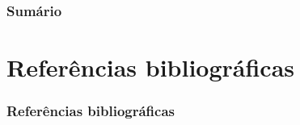     \begin{frame}
        \frametitle{Sumário}
        \tableofcontents%
    \end{frame}

    

    \section{Referências bibliográficas}
    \begin{frame}
        \frametitle{Referências bibliográficas}
        \tiny
        
    \end{frame}

    

    
